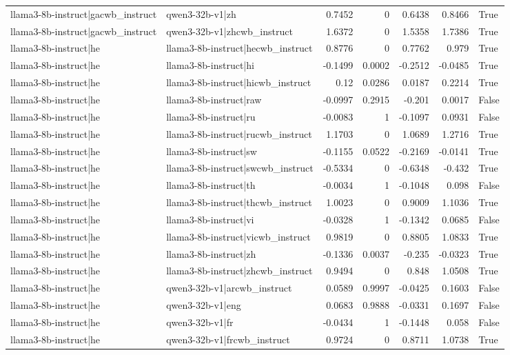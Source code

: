 \begin{table}
\begin{tabular}{l l r r r r l}
llama3-8b-instruct|gacwb_instruct & qwen3-32b-v1|zh & 0.7452 & 0 & 0.6438 & 0.8466 & True \\
llama3-8b-instruct|gacwb_instruct & qwen3-32b-v1|zhcwb_instruct & 1.6372 & 0 & 1.5358 & 1.7386 & True \\
llama3-8b-instruct|he & llama3-8b-instruct|hecwb_instruct & 0.8776 & 0 & 0.7762 & 0.979 & True \\
llama3-8b-instruct|he & llama3-8b-instruct|hi & -0.1499 & 0.0002 & -0.2512 & -0.0485 & True \\
llama3-8b-instruct|he & llama3-8b-instruct|hicwb_instruct & 0.12 & 0.0286 & 0.0187 & 0.2214 & True \\
llama3-8b-instruct|he & llama3-8b-instruct|raw & -0.0997 & 0.2915 & -0.201 & 0.0017 & False \\
llama3-8b-instruct|he & llama3-8b-instruct|ru & -0.0083 & 1 & -0.1097 & 0.0931 & False \\
llama3-8b-instruct|he & llama3-8b-instruct|rucwb_instruct & 1.1703 & 0 & 1.0689 & 1.2716 & True \\
llama3-8b-instruct|he & llama3-8b-instruct|sw & -0.1155 & 0.0522 & -0.2169 & -0.0141 & True \\
llama3-8b-instruct|he & llama3-8b-instruct|swcwb_instruct & -0.5334 & 0 & -0.6348 & -0.432 & True \\
llama3-8b-instruct|he & llama3-8b-instruct|th & -0.0034 & 1 & -0.1048 & 0.098 & False \\
llama3-8b-instruct|he & llama3-8b-instruct|thcwb_instruct & 1.0023 & 0 & 0.9009 & 1.1036 & True \\
llama3-8b-instruct|he & llama3-8b-instruct|vi & -0.0328 & 1 & -0.1342 & 0.0685 & False \\
llama3-8b-instruct|he & llama3-8b-instruct|vicwb_instruct & 0.9819 & 0 & 0.8805 & 1.0833 & True \\
llama3-8b-instruct|he & llama3-8b-instruct|zh & -0.1336 & 0.0037 & -0.235 & -0.0323 & True \\
llama3-8b-instruct|he & llama3-8b-instruct|zhcwb_instruct & 0.9494 & 0 & 0.848 & 1.0508 & True \\
llama3-8b-instruct|he & qwen3-32b-v1|arcwb_instruct & 0.0589 & 0.9997 & -0.0425 & 0.1603 & False \\
llama3-8b-instruct|he & qwen3-32b-v1|eng & 0.0683 & 0.9888 & -0.0331 & 0.1697 & False \\
llama3-8b-instruct|he & qwen3-32b-v1|fr & -0.0434 & 1 & -0.1448 & 0.058 & False \\
llama3-8b-instruct|he & qwen3-32b-v1|frcwb_instruct & 0.9724 & 0 & 0.8711 & 1.0738 & True \\

\end{tabular}
\end{table}
